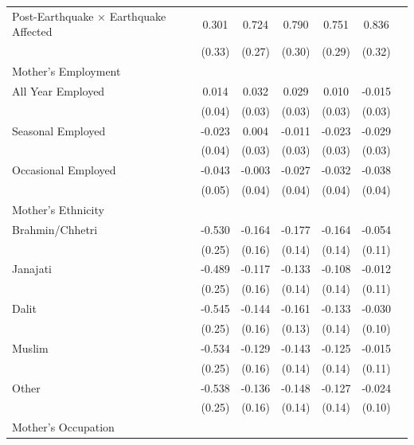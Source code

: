 \begin{longtable}{l*{6}{c}}
Post-Earthquake × Earthquake Affected & 0.301 & 0.724\sym{***} & 0.790\sym{***} & 0.751\sym{**} & 0.836\sym{**} \\
                    & (0.33) & (0.27) & (0.30) & (0.29) & (0.32) \\
\multicolumn{6}{l}{Mother's Employment} \\
\hspace{1em}All Year Employed & 0.014 & 0.032 & 0.029 & 0.010 & -0.015 \\
                    & (0.04) & (0.03) & (0.03) & (0.03) & (0.03) \\
\hspace{1em}Seasonal Employed & -0.023 & 0.004 & -0.011 & -0.023 & -0.029 \\
                    & (0.04) & (0.03) & (0.03) & (0.03) & (0.03) \\
\hspace{1em}Occasional Employed & -0.043 & -0.003 & -0.027 & -0.032 & -0.038 \\
                    & (0.05) & (0.04) & (0.04) & (0.04) & (0.04) \\
\multicolumn{6}{l}{Mother's Ethnicity} \\
\hspace{1em}Brahmin/Chhetri & -0.530\sym{**} & -0.164 & -0.177 & -0.164 & -0.054 \\
                    & (0.25) & (0.16) & (0.14) & (0.14) & (0.11) \\
\hspace{1em}Janajati & -0.489\sym{*} & -0.117 & -0.133 & -0.108 & -0.012 \\
                    & (0.25) & (0.16) & (0.14) & (0.14) & (0.11) \\
\hspace{1em}Dalit & -0.545\sym{**} & -0.144 & -0.161 & -0.133 & -0.030 \\
                    & (0.25) & (0.16) & (0.13) & (0.14) & (0.10) \\
\hspace{1em}Muslim & -0.534\sym{**} & -0.129 & -0.143 & -0.125 & -0.015 \\
                    & (0.25) & (0.16) & (0.14) & (0.14) & (0.11) \\
\hspace{1em}Other & -0.538\sym{**} & -0.136 & -0.148 & -0.127 & -0.024 \\
                    & (0.25) & (0.16) & (0.14) & (0.14) & (0.10) \\
\multicolumn{6}{l}{Mother's Occupation} \\

\end{longtable}
